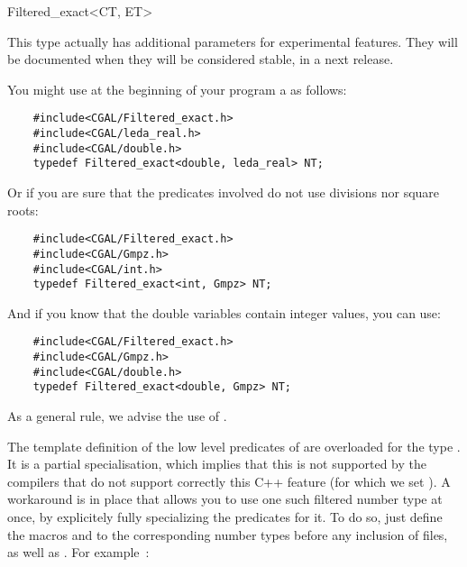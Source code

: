 \begin{ccClassTemplate}{Filtered_exact<CT, ET>}

This type actually has additional parameters for experimental features.  They
will be documented when they will be considered stable, in a next release.

\ccExample

You might use at the beginning of your program a  as follows:

\begin{verbatim}
    #include<CGAL/Filtered_exact.h>
    #include<CGAL/leda_real.h>
    #include<CGAL/double.h>
    typedef Filtered_exact<double, leda_real> NT;
\end{verbatim}

Or if you are sure that the predicates involved do not use divisions nor
square roots:

\begin{verbatim}
    #include<CGAL/Filtered_exact.h>
    #include<CGAL/Gmpz.h>
    #include<CGAL/int.h>
    typedef Filtered_exact<int, Gmpz> NT;
\end{verbatim}

And if you know that the double variables contain integer values, you can
use:

\begin{verbatim}
    #include<CGAL/Filtered_exact.h>
    #include<CGAL/Gmpz.h>
    #include<CGAL/double.h>
    typedef Filtered_exact<double, Gmpz> NT;
\end{verbatim}

As a general rule, we advise the use of
.

% 


\ccImplementation

The template definition of the low level predicates of {\cgal} are overloaded
for the type .  It is a partial specialisation,
which implies that this is not supported by the compilers that do not support
correctly this C++ feature (for which we set ).
A workaround is in place that allows you to use
one such filtered number type at once, by explicitely fully specializing the
predicates for it.  To do so, just define the macros  and
 to the corresponding number types before any inclusion of
{\cgal} files, as well as .  For example~:


\end{ccClassTemplate}
